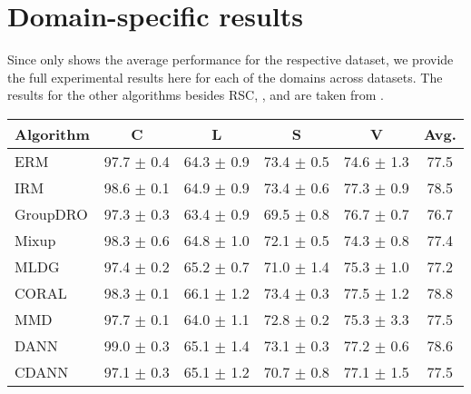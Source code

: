 
\chapter{Domain-specific results} %
\label{sec:DomainResults} 

Since  only shows the average performance for the respective dataset, we provide the full experimental results here for each of the domains across datasets. The results for the other algorithms besides \textsc{RSC}, \divcam, and \dtransformers are taken from \domainbed.

\begin{table*}
\begin{center}
\begin{tabular}{lccccc}
\toprule
\textbf{Algorithm}   & \textbf{C}           & \textbf{L}           & \textbf{S}           & \textbf{V}           & \textbf{Avg.}         \\
\midrule
ERM                  & 97.7 $\pm$ 0.4       & 64.3 $\pm$ 0.9       & 73.4 $\pm$ 0.5       & 74.6 $\pm$ 1.3       & 77.5                 \\
IRM                  & 98.6 $\pm$ 0.1       & 64.9 $\pm$ 0.9       & 73.4 $\pm$ 0.6       & 77.3 $\pm$ 0.9       & 78.5                 \\
GroupDRO             & 97.3 $\pm$ 0.3       & 63.4 $\pm$ 0.9       & 69.5 $\pm$ 0.8       & 76.7 $\pm$ 0.7       & 76.7                 \\
Mixup                & 98.3 $\pm$ 0.6       & 64.8 $\pm$ 1.0       & 72.1 $\pm$ 0.5       & 74.3 $\pm$ 0.8       & 77.4                 \\
MLDG                 & 97.4 $\pm$ 0.2       & 65.2 $\pm$ 0.7       & 71.0 $\pm$ 1.4       & 75.3 $\pm$ 1.0       & 77.2                 \\
CORAL                & 98.3 $\pm$ 0.1       & 66.1 $\pm$ 1.2       & 73.4 $\pm$ 0.3       & 77.5 $\pm$ 1.2       & 78.8                 \\
MMD                  & 97.7 $\pm$ 0.1       & 64.0 $\pm$ 1.1       & 72.8 $\pm$ 0.2       & 75.3 $\pm$ 3.3       & 77.5                 \\
DANN                 & 99.0 $\pm$ 0.3       & 65.1 $\pm$ 1.4       & 73.1 $\pm$ 0.3       & 77.2 $\pm$ 0.6       & 78.6                 \\
CDANN                & 97.1 $\pm$ 0.3       & 65.1 $\pm$ 1.2       & 70.7 $\pm$ 0.8       & 77.1 $\pm$ 1.5       & 77.5                 \\

\end{tabular}
\end{center}
\end{table*}
